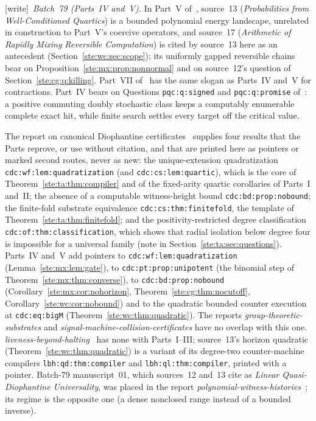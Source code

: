 \documentclass[11pt,letterpaper]{article}
\theoremstyle{definition}
\theoremstyle{remark}
\newcommand{\wtag}{\textup{[write]}}
\begin{document}
\wtag\ \emph{Batch~79 (Parts~IV and~V).} In Part~V of~\cite{pqc}, source~13 (\emph{Probabilities from Well-Conditioned Quartics}) is a bounded polynomial energy landscape, unrelated in construction to Part~V's coercive operators, and source~17 (\emph{Arithmetic of Rapidly Mixing Reversible Computation}) is cited by source~13 here as an antecedent (Section~\ref{ste:wc:sec:scope}); its uniformly gapped reversible chains bear on Proposition~\ref{ste:mx:prop:nonnormal} and on source~12's question of Section~\ref{ste:cg:q:killing}. Part~VII of~\cite{pqc} has the same slogan as Parts~IV and~V for contractions. Part~IV bears on Questions \texttt{pqc:q:signed} and \texttt{pqc:q:promise} of~\cite{pqc}: a positive commuting doubly stochastic class keeps a computably enumerable complete exact hit, while finite search settles every target off the critical value.

The report on canonical Diophantine certificates~\cite{cdc} supplies four results that the Parts reprove, or use without citation, and that are printed here as pointers or marked second routes, never as new: the unique-extension quadratization \texttt{cdc:wf:lem:quadratization} (and \texttt{cdc:cs:lem:quartic}), which is the core of Theorem~\ref{ste:ta:thm:compiler} and of the fixed-arity quartic corollaries of Parts~I and~II; the absence of a computable witness-height bound \texttt{cdc:bd:prop:nobound}; the finite-fold substrate equivalence \texttt{cdc:cs:thm:finitefold}, the template of Theorem~\ref{ste:ta:thm:finitefold}; and the positivity-restricted degree classification \texttt{cdc:of:thm:classification}, which shows that radial isolation below degree four is impossible for a universal family (note in Section~\ref{ste:ta:sec:questions}). Parts~IV and~V add pointers to \texttt{cdc:wf:lem:quadratization} (Lemma~\ref{ste:mx:lem:gate}), to \texttt{cdc:pt:prop:unipotent} (the binomial step of Theorem~\ref{ste:mx:thm:converse}), to \texttt{cdc:bd:prop:nobound} (Corollary~\ref{ste:mx:cor:nohorizon}, Theorem~\ref{ste:cg:thm:nocutoff}, Corollary~\ref{ste:wc:cor:nobound}) and to the quadratic bounded counter execution at \texttt{cdc:eq:bigM} (Theorem~\ref{ste:wc:thm:quadratic}). The reports \emph{group-theoretic-substrates} and \emph{signal-machine-collision-certificates} have no overlap with this one. \emph{liveness-beyond-halting}~\cite{lbh} has none with Parts~I--III; source~13's horizon quadratic (Theorem~\ref{ste:wc:thm:quadratic}) is a variant of its degree-two counter-machine compilers \texttt{lbh:qd:thm:compiler} and \texttt{lbh:ql:thm:compiler}, printed with a pointer. Batch-79 manuscript~01, which sources~12 and~13 cite as \emph{Linear Quasi-Diophantine Universality}, was placed in the report \emph{polynomial-witness-histories}~\cite{pwh}; its regime is the opposite one (a dense nonclosed range instead of a bounded inverse).
\end{document}
